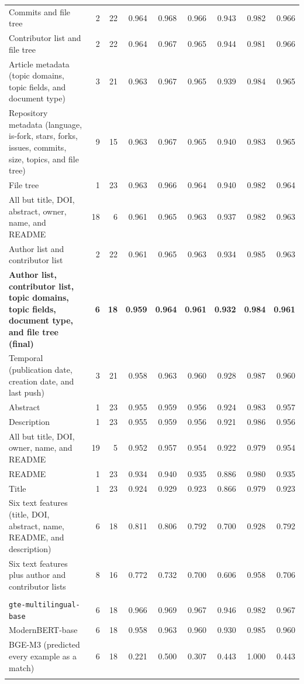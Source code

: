 \documentclass[pdflatex,sn-nature]{sn-jnl}%
\begin{document}
\begin{table}
\begin{tabular}{@{}>{\raggedright\arraybackslash}p{248pt}rrrrrrrr@{}}
Commits and file tree & 2 & 22 & 0.964 & 0.968 & 0.966 & 0.943 & 0.982 & 0.966 \\
Contributor list and file tree & 2 & 22 & 0.964 & 0.967 & 0.965 & 0.944 & 0.981 & 0.966 \\
Article metadata (topic domains, topic fields, and document type) & 3 & 21 & 0.963 & 0.967 & 0.965 & 0.939 & 0.984 & 0.965 \\
Repository metadata (language, is-fork, stars, forks, issues, commits, size, topics, and file tree) & 9 & 15 & 0.963 & 0.967 & 0.965 & 0.940 & 0.983 & 0.965 \\
File tree & 1 & 23 & 0.963 & 0.966 & 0.964 & 0.940 & 0.982 & 0.964 \\
All but title, DOI, abstract, owner, name, and README & 18 & 6 & 0.961 & 0.965 & 0.963 & 0.937 & 0.982 & 0.963 \\
Author list and contributor list & 2 & 22 & 0.961 & 0.965 & 0.963 & 0.934 & 0.985 & 0.963 \\
\textbf{Author list, contributor list, topic domains, topic fields, document type, and file tree (final)} & \textbf{6} & \textbf{18} & \textbf{0.959} & \textbf{0.964} & \textbf{0.961} & \textbf{0.932} & \textbf{0.984} & \textbf{0.961} \\
Temporal (publication date, creation date, and last push) & 3 & 21 & 0.958 & 0.963 & 0.960 & 0.928 & 0.987 & 0.960 \\
Abstract & 1 & 23 & 0.955 & 0.959 & 0.956 & 0.924 & 0.983 & 0.957 \\
Description & 1 & 23 & 0.955 & 0.959 & 0.956 & 0.921 & 0.986 & 0.956 \\
All but title, DOI, owner, name, and README & 19 & 5 & 0.952 & 0.957 & 0.954 & 0.922 & 0.979 & 0.954 \\
README & 1 & 23 & 0.934 & 0.940 & 0.935 & 0.886 & 0.980 & 0.935 \\
Title & 1 & 23 & 0.924 & 0.929 & 0.923 & 0.866 & 0.979 & 0.923 \\
Six text features (title, DOI, abstract, name, README, and description) & 6 & 18 & 0.811 & 0.806 & 0.792 & 0.700 & 0.928 & 0.792 \\
Six text features plus author and contributor lists & 8 & 16 & 0.772 & 0.732 & 0.700 & 0.606 & 0.958 & 0.706 \\
\midrule
\multicolumn{9}{@{}l}{\textit{Base model (final 18 features)}}\\
\addlinespace[2pt]
\texttt{gte-multilingual-base} & 6 & 18 & 0.966 & 0.969 & 0.967 & 0.946 & 0.982 & 0.967 \\
ModernBERT-base & 6 & 18 & 0.958 & 0.963 & 0.960 & 0.930 & 0.985 & 0.960 \\
BGE-M3 (predicted every example as a match) & 6 & 18 & 0.221 & 0.500 & 0.307 & 0.443 & 1.000 & 0.443 \\
\botrule
\end{tabular}
\end{table}
\end{document}
